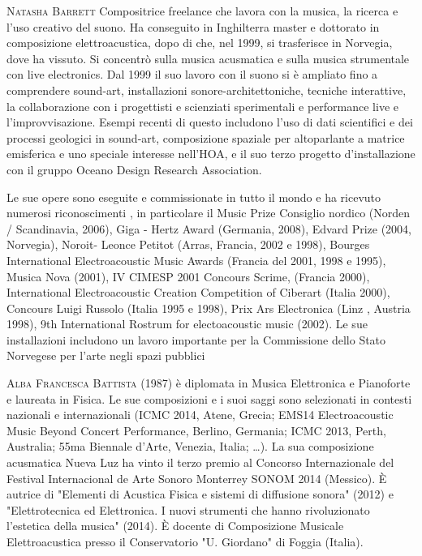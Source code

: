 \documentclass[9pt, twoside, a5paper]{extreport}
\newcommand{\biografia}[2]{%
\noindent \textsc{#1} %
#2 %
\medskip
}%
\begin{document}
\begin{multicols}{2}
\biografia{Natasha Barrett}{Compositrice freelance che lavora con la musica, la ricerca e l'uso creativo del suono. Ha conseguito in Inghilterra master e dottorato in composizione elettroacustica, dopo di che, nel 1999, si trasferisce in Norvegia, dove ha vissuto. Si concentrò sulla musica acusmatica e sulla musica strumentale con live electronics. Dal 1999 il suo lavoro con il suono si è ampliato fino a comprendere sound-art, installazioni sonore-architettoniche, tecniche interattive, la collaborazione con i progettisti e scienziati sperimentali e performance live e l'improvvisazione. Esempi recenti di questo includono l'uso di dati scientifici e dei processi geologici in sound-art, composizione spaziale per altoparlante a matrice emisferica e uno speciale interesse nell’HOA, e il suo terzo progetto d’installazione con il gruppo Oceano Design Research Association.

Le sue opere sono eseguite e commissionate in tutto il mondo e ha ricevuto numerosi riconoscimenti , in particolare il Music Prize Consiglio nordico (Norden / Scandinavia, 2006), Giga - Hertz Award (Germania, 2008), Edvard Prize (2004, Norvegia), Noroit- Leonce Petitot (Arras, Francia, 2002 e 1998), Bourges International Electroacoustic Music Awards (Francia del 2001, 1998 e 1995), Musica Nova (2001), IV CIMESP 2001 Concours Scrime, (Francia 2000), International Electroacoustic Creation Competition of Ciberart (Italia 2000), Concours Luigi Russolo (Italia 1995 e 1998), Prix Ars Electronica (Linz , Austria 1998), 9th International Rostrum for electoacoustic music (2002). Le sue installazioni includono un lavoro importante per la Commissione dello Stato Norvegese per l'arte negli spazi pubblici}

\biografia{Alba Francesca Battista}{(1987) è diplomata in Musica Elettronica e Pianoforte e laureata in Fisica. Le sue composizioni e i suoi saggi sono selezionati in contesti nazionali e internazionali (ICMC 2014, Atene, Grecia; EMS14 Electroacoustic Music Beyond Concert Performance, Berlino, Germania; ICMC 2013, Perth, Australia; 55ma Biennale d’Arte, Venezia, Italia; \dots). La sua composizione acusmatica Nueva Luz ha vinto il terzo premio al Concorso Internazionale del Festival Internacional de Arte Sonoro Monterrey SONOM 2014 (Messico). È autrice di "Elementi di Acustica Fisica e sistemi di diffusione sonora" (2012) e "Elettrotecnica ed Elettronica. I nuovi strumenti che hanno rivoluzionato l’estetica della musica" (2014). È docente di Composizione Musicale Elettroacustica presso il Conservatorio "U. Giordano" di Foggia (Italia).}


\end{multicols}
\end{document}
